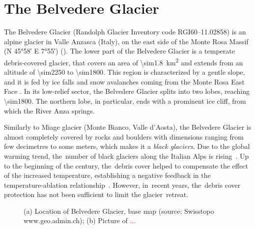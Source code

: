 \section{The Belvedere Glacier}\label{sec:1:belvedereglacier}

The Belvedere Glacier (Randolph Glacier Inventory code RGI60--11.02858) is an alpine
glacier in Valle Anzasca (Italy), on the east side of the Monte Rosa Massif (N
\ang{45;58} E \ang{7;55}) ().
The lower part of the Belvedere Glacier is a temperate debris-covered glacier, that
covers an area of
\SI{\sim1.8}{\kilo\meter\squared} and extends from an altitude of \SI{\sim2250}{\masl} to
\SI{\sim1800}{\masl}.
This region is characterized by a gentle slope, and it is fed by ice falls and snow
avalanches coming from the Monte Rosa East Face \citep{Haeberli2002}. In its low-relief
sector, the Belvedere Glacier splits into two lobes, reaching \SI{\sim1800}{\masl}.
The northern lobe, in particular, ends with a prominent ice cliff, from which the River
Anza springs.

Similarly to Miage glacier (Monte Bianco, Valle d’Aosta), the Belvedere Glacier is almost
completely covered by rocks and boulders with dimensions ranging from few decimetres to
some meters, which makes it a \textit{black glaciers}.
Due to the global warming trend, the~number of black glaciers along the Italian Alps is
rising~\citep{Diolaiuti2003}.
Up to the beginning of the century, the~debris cover helped to compensate the effect of
the increased temperature, establishing a negative feedback in the temperature-ablation
relationship~\citep{Roethlisberger1985,Diolaiuti2003}.
However, in~recent years, the~debris cover protection has not been sufficient to limit
the glacier~retreat.

\begin{figure}
    \centering
    \caption{(a) Location of Belvedere Glacier, base map (source: Swisstopo
        www.geo.admin.ch); (b) Picture of \textcolor{red}{...}}
    \label{fig:1:studyarea}
\end{figure}


